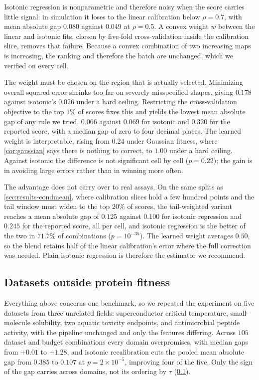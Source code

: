 \documentclass{article}
\theoremstyle{plain}
\theoremstyle{definition}
\begin{document}
Isotonic regression is nonparametric and therefore noisy when the score carries little
signal: in simulation it loses to the linear calibration below $\rho = 0.7$, with mean
absolute gap $0.080$ against $0.049$ at $\rho = 0.5$. A convex weight $w$ between the
linear and isotonic fits, chosen by five-fold cross-validation inside the calibration
slice, removes that failure. Because a convex combination of two increasing maps is
increasing, the ranking and therefore the batch are unchanged, which we verified on
every cell.

The weight must be chosen on the region that is actually selected. Minimizing overall
squared error shrinks too far on severely misspecified shapes, giving $0.178$ against
isotonic's $0.026$ under a hard ceiling. Restricting the cross-validation objective to
the top $1\%$ of scores fixes this and yields the lowest mean absolute gap of any rule
we tried, $0.066$ against $0.069$ for isotonic and $0.320$ for the reported score, with
a median gap of zero to four decimal places. The learned weight is interpretable,
rising from $0.24$ under Gaussian fitness, where \cref{cor:gaussian} says there is
nothing to correct, to $1.00$ under a hard ceiling. Against isotonic the difference is
not significant cell by cell ($p = 0.22$); the gain is in avoiding large errors rather
than in winning more often.

The advantage does not carry over to real assays. On the same splits as
\cref{sec:results-condmean}, where calibration slices hold a few hundred points and the
tail window must widen to the top $20\%$ of scores, the tail-weighted variant reaches a
mean absolute gap of $0.125$ against $0.100$ for isotonic regression and $0.245$ for the
reported score, all per cell, and isotonic regression is the better of the two in $71.7\%$ of
combinations ($p = 10^{-35}$). The learned weight averages $0.50$, so the blend
retains half of the linear calibration's error where the full correction was needed.
Plain isotonic regression is therefore the estimator we recommend.

\subsection{Datasets outside protein fitness}
\label{app:domains}

Everything above concerns one benchmark, so we repeated the experiment on five datasets
from three unrelated fields: superconductor critical temperature, small-molecule
solubility, two aquatic toxicity endpoints, and antimicrobial peptide activity, with
the pipeline unchanged and only the features differing. Across $105$ dataset and budget
combinations every domain overpromises, with median gaps from $+0.01$ to $+1.28$, and
isotonic recalibration cuts the pooled mean absolute gap from $0.385$ to $0.107$ at
$p = 2 \times 10^{-5}$, improving four of the five. Only the sign of the gap carries
across domains, not its ordering by $\tau$ \mbox{(\cref{app:domains})}.
\end{document}
